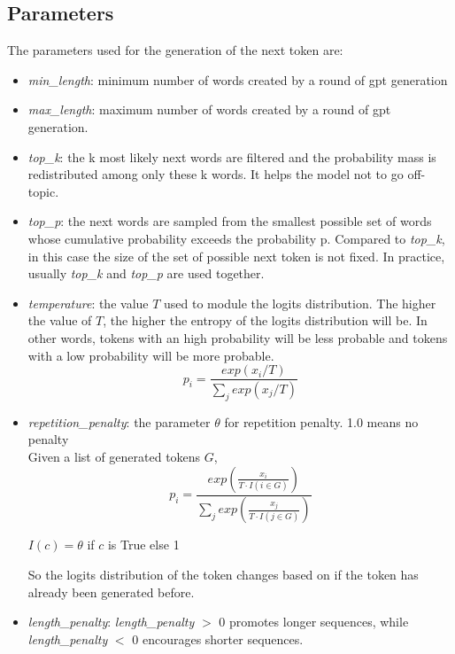 \subsection{Parameters}
\label{sec:parameters}
The parameters used for the generation of the next token are:
\begin{itemize}
    \item \textit{min\_length}: minimum number of words created by a round of gpt generation
    \item \textit{max\_length}: maximum number of words created by a round of gpt generation.  
    \item \textit{top\_k}: the k most likely next words are filtered and the probability mass is redistributed among only these k words. It helps the model not to go off-topic.
    \item \textit{top\_p}: the next words are sampled from the smallest possible set of words whose cumulative probability exceeds the probability p. Compared to \textit{top\_k}, in this case the size of the set of possible next token is not fixed. In practice, usually \textit{top\_k} and \textit{top\_p} are used together.
    \item \textit{temperature}: the value $T$ used to module the logits distribution. The higher the value of $T$, the higher the entropy of the logits distribution will be. In other words, tokens with an high probability will be less probable and tokens with a low probability will be more probable.
    \begin{equation*}
        p_i = \frac{exp(x_i/T)}{\sum_j exp(x_j/T)}   
    \end{equation*}
    \item \textit{repetition\_penalty}: the parameter $\theta$ for repetition penalty. 1.0 means no penalty \\
    Given a list of generated tokens $G$, 
     \begin{equation*}
        p_i = \frac{exp\left(\frac{x_i}{T \cdot I(i \in G)}\right)}{\sum_j exp\left(\frac{x_j}{T \cdot I(j \in G)}\right)}
    \end{equation*}
    \begin{center}
    $I(c) = \theta$ if $c$ is True else 1
    \end{center}    
    So the logits distribution of the token changes based on if the token has already been generated before.

    \item \textit{length\_penalty}: \textit{length\_penalty} $>$ 0 promotes longer sequences, while \linebreak 
    \textit{length\_penalty} $<$ 0 encourages shorter sequences.


\end{itemize}
